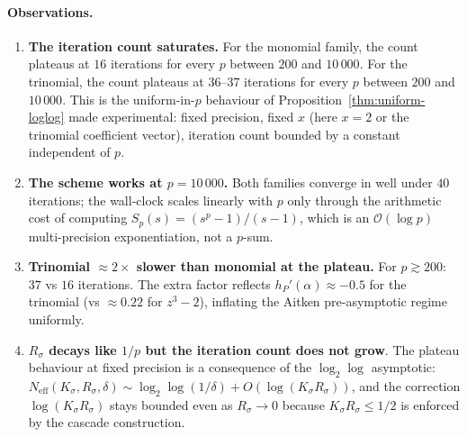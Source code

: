 \documentclass[11pt,a4paper]{article}
\theoremstyle{definition}
\begin{document}
\paragraph{Observations.}
\begin{enumerate}
  \item \textbf{The iteration count saturates.} For the monomial family, the count plateaus at $16$ iterations for every $p$ between $200$ and $10\,000$. For the trinomial, the count plateaus at $36$--$37$ iterations for every $p$ between $200$ and $10\,000$. This is the uniform-in-$p$ behaviour of Proposition~\ref{thm:uniform-loglog} made experimental: fixed precision, fixed $x$ (here $x = 2$ or the trinomial coefficient vector), iteration count bounded by a constant independent of $p$.
  \item \textbf{The scheme works at $p = 10\,000$.} Both families converge in well under $40$ iterations; the wall-clock scales linearly with $p$ only through the arithmetic cost of computing $S_p(s) = (s^p - 1)/(s - 1)$, which is an $\mathcal{O}(\log p)$ multi-precision exponentiation, not a $p$-sum.
  \item \textbf{Trinomial $\approx 2\times$ slower than monomial at the plateau.} For $p \gtrsim 200$: $37$ vs $16$ iterations. The extra factor reflects $h_P'(\alpha) \approx -0.5$ for the trinomial (vs $\approx 0.22$ for $z^3 - 2$), inflating the Aitken pre-asymptotic regime uniformly.
  \item \textbf{$R_\sigma$ decays like $1/p$ but the iteration count does not grow}. The plateau behaviour at fixed precision is a consequence of the $\log_2\log$ asymptotic: $N_{\mathrm{eff}}(K_\sigma, R_\sigma, \delta) \sim \log_2\log(1/\delta) + O(\log(K_\sigma R_\sigma))$, and the correction $\log(K_\sigma R_\sigma)$ stays bounded even as $R_\sigma \to 0$ because $K_\sigma R_\sigma \leq 1/2$ is enforced by the cascade construction.
\end{enumerate}
\end{document}
